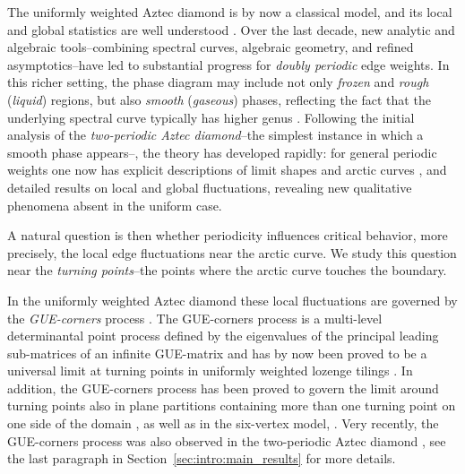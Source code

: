 \documentclass[11pt]{article}
\theoremstyle{plain}
\theoremstyle{definition}
\numberwithin{equation}{section}
\begin{document}
The uniformly weighted Aztec diamond is by now a classical model, and its local and global statistics are well understood \cite{BG18, CJY15, CEP96, Joh05a}. 
 Over the last decade, new analytic and algebraic tools--combining spectral curves, algebraic geometry, and refined asymptotics--have led to substantial progress for \textit{doubly periodic} edge weights. In this richer setting, the phase diagram may include not only \textit{frozen} and \textit{rough} (\textit{liquid}) regions, but also \textit{smooth} (\textit{gaseous}) phases, reflecting the fact that the underlying spectral curve typically has higher genus \cite{KOS06}. Following the initial analysis of the \emph{two-periodic Aztec diamond}--the simplest instance in which a smooth phase appears--\cite{CJ16,CY14,DK21}, the theory has developed rapidly: for general periodic weights one now has explicit descriptions of limit shapes and arctic curves \cite{ADPZ20,BB23,BB24}, and detailed results on local \cite{BB23,BdT24} and global \cite{BN25} fluctuations, revealing new qualitative phenomena absent in the uniform case.
 
A natural question is then whether periodicity influences critical behavior, more precisely, the local edge fluctuations near the arctic curve. %
We study this question near the \textit{turning points}--the points where the arctic curve touches the boundary.


In the uniformly weighted Aztec diamond these local fluctuations 
are governed by the \textit{GUE-corners} process \cite{JN06}. The GUE-corners process is a multi-level determinantal point process defined by the eigenvalues of the principal leading sub-matrices of an infinite GUE-matrix and has by now been proved to be a universal limit at turning points in uniformly weighted lozenge tilings \cite{AG21, GP15, MP17, OR06}.
In addition, the GUE-corners process has been proved to govern the limit around turning points also in plane partitions containing more than one turning point on one side of the domain \cite{Mkr21}, as well as in the six-vertex model, \cite{Dim20, DR20, GL25}.
Very recently, the GUE-corners process was also observed in the two-periodic Aztec diamond \cite{RR25}, see the last paragraph in Section~\ref{sec:intro:main_results} for more details. 
\end{document}

